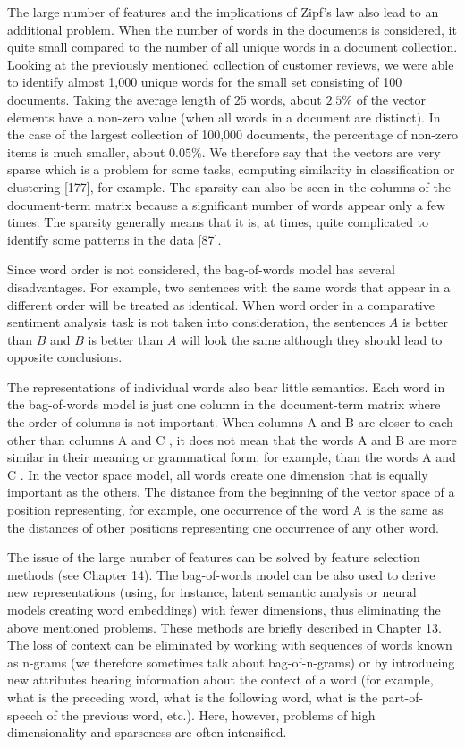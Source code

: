 \documentclass[11pt,openany,executivepaper]{book}
\begin{document}
The large number of features and the implications of Zipf's law also lead to an additional problem. When the number of words in the documents is considered, it quite small compared to the number of all unique words in a document collection. Looking at the previously mentioned collection of customer reviews, we were able to identify almost 1,000 unique words for the small set consisting of 100 documents. Taking the average length of 25 words, about $2.5 \%$ of the vector elements have a non-zero value (when all words in a document are distinct). In the case of the largest collection of 100,000 documents, the percentage of non-zero items is much smaller, about $0.05 \%$. We therefore say that the vectors are very sparse which is a problem for some tasks, computing similarity in classification or clustering [177], for example. The sparsity can also be seen in the columns of the document-term matrix because a significant number of words appear only a few times. The sparsity generally means that it is, at times, quite complicated to identify some patterns in the data [87].

Since word order is not considered, the bag-of-words model has several disadvantages. For example, two sentences with the same words that appear in a different order will be treated as identical. When word order in a comparative sentiment analysis task is not taken into consideration, the sentences $A$ is better than $B$ and $B$ is better than $A$ will look the same although they should lead to opposite conclusions.

The representations of individual words also bear little semantics. Each word in the bag-of-words model is just one column in the document-term matrix where the order of columns is not important. When columns A and B are closer to each\\
other than columns A and C , it does not mean that the words A and B are more similar in their meaning or grammatical form, for example, than the words A and C . In the vector space model, all words create one dimension that is equally important as the others. The distance from the beginning of the vector space of a position representing, for example, one occurrence of the word A is the same as the distances of other positions representing one occurrence of any other word.

The issue of the large number of features can be solved by feature selection methods (see Chapter 14). The bag-of-words model can be also used to derive new representations (using, for instance, latent semantic analysis or neural models creating word embeddings) with fewer dimensions, thus eliminating the above mentioned problems. These methods are briefly described in Chapter 13. The loss of context can be eliminated by working with sequences of words known as n-grams (we therefore sometimes talk about bag-of-n-grams) or by introducing new attributes bearing information about the context of a word (for example, what is the preceding word, what is the following word, what is the part-of-speech of the previous word, etc.). Here, however, problems of high dimensionality and sparseness are often intensified.
\end{document}
